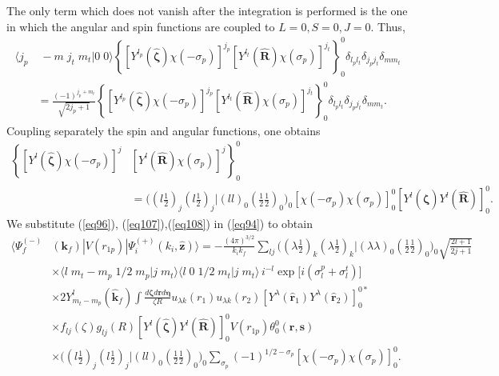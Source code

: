 The only term which does not vanish after the integration is performed is the one in which the angular and spin functions are coupled to $L=0,S=0,J=0$. Thus,
\begin{equation}\label{eq7_2_11}
\begin{split}
\langle j_p & \;-m\;j_t\;m_t|0\;0\rangle \left\{\left[Y^{l_p}
 (\hat{\boldsymbol{\zeta}})\chi(-\sigma_p)\right]^{j_p}
 \left[Y^{l_t}(\hat{\mathbf{R}})\chi(\sigma_p)\right]^{j_t}\right\}_{0}^{0}\delta_{l_pl_t}\delta_{j_pj_t}\delta_{mm_t}\\
& =\frac{(-1)^{j_p+m_t}}{\sqrt{2j_p+1}}\left\{\left[Y^{l_p}
 (\hat{\boldsymbol{\zeta}})\chi(-\sigma_p)\right]^{j_p}
 \left[Y^{l_t}(\hat{\mathbf{R}})\chi(\sigma_p)\right]^{j_t}\right\}_{0}^{0}\delta_{l_pl_t}\delta_{j_pj_t}\delta_{mm_t}.
 \end{split}
\end{equation}
Coupling separately the spin and angular functions, one obtains
 \begin{equation}\label{eq7_2_12}
\begin{split}
\left\{\left[Y^{l}
 (\hat{\boldsymbol{\zeta}})\chi(-\sigma_p)\right]^{j}\right.&\left.
 \left[Y^{l}(\hat{\mathbf{R}})\chi(\sigma_p)\right]^{j}\right\}_{0}^{0}\\
& =\bigl((l \tfrac{1}{2})_{j}(l \tfrac{1}{2})_{j}|(l l)_0(\tfrac{1}{2}\tfrac{1}{2})_0\bigr)_0
\left[\chi(-\sigma_p)\chi(\sigma_p)\right]^{0}_{0}
 \left[Y^{l}(\hat{\boldsymbol{\zeta}})Y^{l}(\hat{\mathbf{R}})\right]^{0}_{0}.
 \end{split}
\end{equation}
 We substitute (\ref{eq96}), (\ref{eq107}),(\ref{eq108}) in (\ref{eq94}) to obtain
\begin{equation}\label{eq98}
  \begin{split}
  \langle \Psi_f^{(-)}&(\mathbf{k}_f)|V(r_{1p})|\Psi_i^{(+)}(k_i,\hat {\mathbf{z}})\rangle=-\frac{(4\pi)^{3/2}}{k_ik_f}\sum_{lj}\bigl((\lambda \tfrac{1}{2})_k(\lambda \tfrac{1}{2})_k|(\lambda \lambda)_0(\tfrac{1}{2}\tfrac{1}{2})_0\bigr)_0\sqrt{\frac{2l+1}{2j+1}}\\
  &\times \langle l \;m_t-m_p\;1/2\;m_p|j\;m_t\rangle\langle l \;0\;1/2\;m_t|j\;m_t\rangle\,i^{-l}\exp\bigl[i(\sigma_{l}^p+\sigma_{l}^t)\bigr]\\
  &\times 2 Y_{m_t-m_p}^{l}(\hat{\mathbf{k}}_f) \int \frac {d\boldsymbol{\zeta}d\mathbf{r}d\boldsymbol{\eta}}{\zeta R} u_{\lambda k}(r_1)u_{\lambda k}(r_2)\left[Y^{\lambda}(\hat{\mathbf{r}}_1)Y^{\lambda}(\hat{\mathbf{r}}_2)\right]^{0*}_{0}\\
  &\times f_{lj}(\zeta)g_{lj}(R)\left[Y^{l}(\hat{\boldsymbol{\zeta}})Y^{l}(\hat{\mathbf{R}})\right]^{0}_{0} V(r_{1p}) \theta_0^0(\mathbf{r},\mathbf{s})\\
  &\times \bigl((l \tfrac{1}{2})_{j}(l \tfrac{1}{2})_{j}|(l l)_0(\tfrac{1}{2}\tfrac{1}{2})_0\bigr)_0\sum_{\sigma_p}(-1)^{1/2-\sigma_p}\left[\chi(-\sigma_p)\chi(\sigma_p)\right]^{0}_{0}.
  \end{split}
\end{equation}
